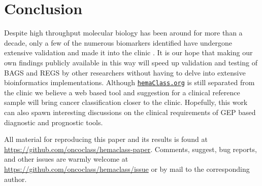 \documentclass{bmcart}
\newcommand{\hemaClass}{\href{http://hemaClass.org}{\texttt{hemaClass.org}}}
\begin{document}
\section{Conclusion}
Despite high throughput molecular biology has been around for more than a decade, only a few of the numerous biomarkers identified have undergone extensive validation and made it into the clinic \citep{Chen2012a}.
It is our hope that making our own findings publicly available in this way will speed up validation and testing of BAGS and REGS by other researchers without having to delve into extensive bioinformatics implementations.
Although \hemaClass{} is still separated from the clinic we believe a web based tool and suggestion for a clinical reference sample will bring cancer classification closer to the clinic.
Hopefully, this work can also spawn interesting discussions on the clinical requirements of GEP based diagnostic and prognostic tools.

All material for reproducing this paper and its results is found at \url{https://github.com/oncoclass/hemaclass-paper}.
Comments, suggest, bug reports, and other issues are warmly welcome at \url{https://github.com/oncoclass/hemaclass/issue} or by mail to the corresponding author.

\end{document}
